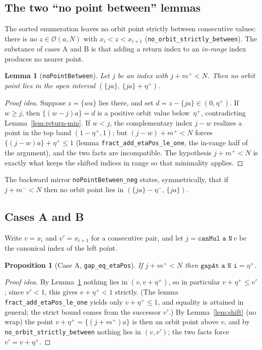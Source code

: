 \documentclass[11pt,reqno]{amsart}
\theoremstyle{plain}
\newtheorem{lemma}[theorem]{Lemma}
\newtheorem{proposition}[theorem]{Proposition}
\theoremstyle{definition}
\theoremstyle{remark}
\newcommand{\fract}[1]{\{#1\}}
\newcommand{\etap}{\eta^{+}}
\newcommand{\etam}{\eta^{-}}
\newcommand{\mpl}{m^{+}}
\newcommand{\mmi}{m^{-}}
\newcommand{\orb}{\mathcal{O}}
\newcommand{\code}[1]{\texttt{#1}}
\begin{document}
\subsection{The two ``no point between'' lemmas}

The sorted enumeration leaves no orbit point strictly between consecutive
values: there is no $z\in\orb(a,N)$ with $x_i<z<x_{i+1}$
(\code{no\_orbit\_strictly\_between}).  The substance of cases A and B is that
adding a return index to an \emph{in-range} index produces no nearer point.

\begin{lemma}[\code{noPointBetween}]\label{lem:npb}
Let $j$ be an index with $j+\mpl<N$.  Then no orbit point lies in the open
interval $(\fract{j a},\,\fract{j a}+\etap)$.
\end{lemma}

\begin{proof}[Proof idea]
Suppose $z=\fract{w a}$ lies there, and set $d=z-\fract{j a}\in(0,\etap)$.  If
$w\ge j$, then $\fract{(w-j)a}=d$ is a positive orbit value below~$\etap$,
contradicting Lemma~\ref{lem:return-min}.  If $w<j$, the complementary index
$j-w$ realizes a point in the top band $(1-\etap,1)$; but $(j-w)+\mpl<N$ forces
$\fract{(j-w)a}+\etap\le 1$ (lemma \code{fract\_add\_etaPos\_le\_one}, the
in-range half of the argument), and the two facts are incompatible.  The
hypothesis $j+\mpl<N$ is exactly what keeps the shifted indices in range so that
minimality applies.
\end{proof}

The backward mirror \code{noPointBetween\_neg} states, symmetrically, that if
$j+\mmi<N$ then no orbit point lies in $(\fract{j a}-\etam,\,\fract{j a})$.

\subsection{Cases A and B}

Write $v=x_i$ and $v'=x_{i+1}$ for a consecutive pair, and let
$j=\code{canMul a N}\,v$ be the canonical index of the left point.

\begin{proposition}[Case A, \code{gap\_eq\_etaPos}]\label{prop:caseA}
If $j+\mpl<N$ then $\code{gapAt a N i}=\etap$.
\end{proposition}

\begin{proof}[Proof idea]
By Lemma~\ref{lem:npb} nothing lies in $(v,v+\etap)$, so in particular
$v+\etap\le v'$; since $v'<1$, this gives $v+\etap<1$ strictly.  (The lemma
\code{fract\_add\_etaPos\_le\_one} yields only $v+\etap\le 1$, and equality is
attained in general; the strict bound comes from the successor $v'$.)  By
Lemma~\ref{lem:shift} (no wrap) the point $v+\etap=\fract{(j+\mpl)a}$ is then an
orbit point above $v$, and by \code{no\_orbit\_strictly\_between} nothing lies
in $(v,v')$; the two facts force $v'=v+\etap$.
\end{proof}
\end{document}
